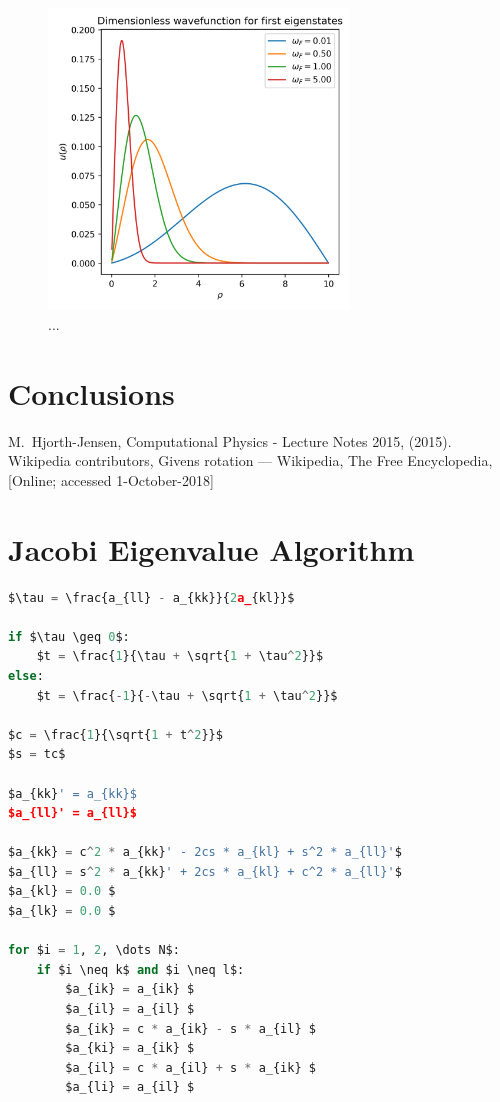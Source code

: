 \documentclass[10pt,showpacs,preprintnumbers,footinbib,amsmath,amssymb,aps,prl,twocolumn,groupedaddress,superscriptaddress,showkeys]{revtex4-1}
\begin{document}
  \begin{figure}[h!]
    \center
    \includegraphics[width=8cm]{figs/question2e.png}
    \caption{...}
  \end{figure}


\section{Conclusions}

\begin{thebibliography}{99}
 M.~Hjorth-Jensen, Computational Physics - Lecture Notes 2015, (2015).
 Wikipedia contributors, Givens rotation --- {Wikipedia}{,} The Free Encyclopedia, [Online; accessed 1-October-2018]
\end{thebibliography}

\newpage
\appendix
\section{Jacobi Eigenvalue Algorithm}
\begin{lstlisting}[mathescape=true, language=python]
$\tau = \frac{a_{ll} - a_{kk}}{2a_{kl}}$

if $\tau \geq 0$:
    $t = \frac{1}{\tau + \sqrt{1 + \tau^2}}$
else:
    $t = \frac{-1}{-\tau + \sqrt{1 + \tau^2}}$

$c = \frac{1}{\sqrt{1 + t^2}}$
$s = tc$

$a_{kk}' = a_{kk}$
$a_{ll}' = a_{ll}$

$a_{kk} = c^2 * a_{kk}' - 2cs * a_{kl} + s^2 * a_{ll}'$
$a_{ll} = s^2 * a_{kk}' + 2cs * a_{kl} + c^2 * a_{ll}'$
$a_{kl} = 0.0 $
$a_{lk} = 0.0 $

for $i = 1, 2, \dots N$:
    if $i \neq k$ and $i \neq l$:
        $a_{ik} = a_{ik} $
        $a_{il} = a_{il} $
        $a_{ik} = c * a_{ik} - s * a_{il} $
        $a_{ki} = a_{ik} $
        $a_{il} = c * a_{il} + s * a_{ik} $
        $a_{li} = a_{il} $
\end{lstlisting}
\end{document}

